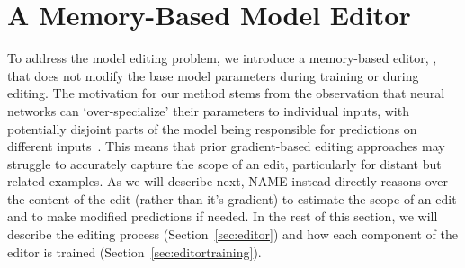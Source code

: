 \documentclass{article}
\begin{document}
\section{A Memory-Based Model Editor}
\label{sec:method}

To address the model editing problem, we introduce a memory-based editor, {\name}, that does not modify the base model parameters during training or during editing. The motivation for our method stems from the observation that neural networks can `over-specialize' their parameters to individual inputs, with potentially disjoint parts of the model being responsible for predictions on different inputs~\citep{csordas2021are}. This means that prior gradient-based editing approaches may struggle to accurately capture the scope of an edit, particularly for distant but related examples. As we will describe next, NAME instead directly reasons over the content of the edit (rather than it's gradient) to estimate the scope of an edit and to make modified predictions if needed. In the rest of this section, we will describe the editing process (Section~\ref{sec:editor}) and how each component of the editor is trained (Section~\ref{sec:editortraining}).

\end{document}

